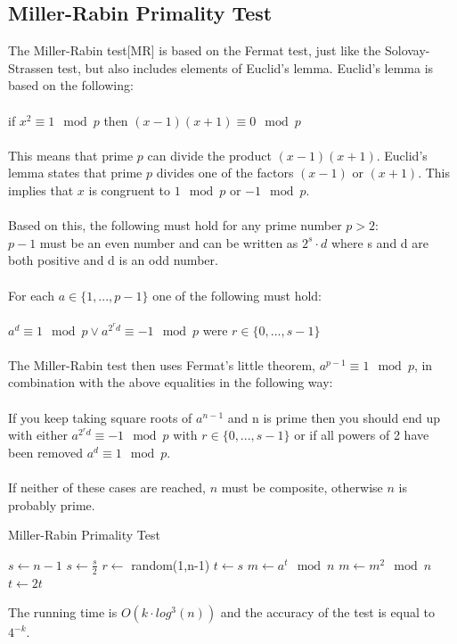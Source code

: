 \documentclass[compressed,final,notitlepage,narroweqnarray,inline,twoside,]{ieee}
\begin{document}
\subsection{Miller-Rabin Primality Test}
The Miller-Rabin test[MR] is based on the Fermat test, just like the Solovay-Strassen test, but also includes elements of Euclid’s lemma.  Euclid’s lemma is based on the following:\\\\
if $x^2 \equiv 1 \mod p	$ then $(x-1)(x+1) \equiv 0 \mod p$\\\\
This means that prime $p$ can divide the product $(x-1)(x+1)$. Euclid’s lemma states that prime $p$ divides one of the factors $(x-1)$ or $(x+1)$. This implies that $x$ is congruent to $1 \mod p$ or $-1 \mod p$.\\\\ Based on this, the following must hold for any prime number $p>2$:\\
$p-1$ must be an even number and can be written as $2^s\cdot d$ where s and d are both positive and d is an odd number.\\\\
For each $a \in \{1,...,p-1\}$ one of the following must hold:\\\\
$a^d \equiv 1 \mod p \vee a^{2^rd} \equiv -1 \mod p$ were $r \in \{0,...,s-1\}$\\\\
The Miller-Rabin test then uses Fermat’s little theorem, $a^{p-1} \equiv 1 \mod p$, in combination with the above equalities in the following way:\\\\
If you keep taking square roots of $a^{n-1}$ and n is prime then you should end up with either $a^{2^rd} \equiv -1 \mod p$ with $r\in \{0,...,s-1\}$ or if all powers of 2 have been removed $a^d \equiv 1 \mod p$. \\\\
If neither of these cases are reached, $n$ must be composite, otherwise $n$ is probably prime.

\begin{algorithm}[ht]
 \caption{Miller-Rabin Primality Test}
 $s \longleftarrow n-1$ \;
 {
 	$s \longleftarrow \frac{s}{2}$\;
 }
 {
	$r \longleftarrow$ random(1,n-1) \;
	$t \longleftarrow s$\;
	$m \longleftarrow a^t \mod n$ \;
	 {
	 	$m \longleftarrow m^2 \mod n$ \;
	 	$t \longleftarrow 2t$
	 }
	{
		\;
	}
 }
 \;
\end{algorithm}
The running time is $O(k\cdot log^3(n))$ and the accuracy of the test is equal to $4^{-k}$.
\end{document}
